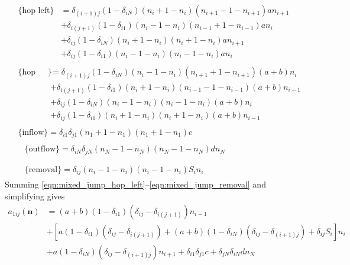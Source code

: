 \documentclass[a4paper,11pt]{article}
\numberwithin{equation}{section}
\newcommand{\V}[1]{\mathbf{#1}}
\begin{document}
\begin{align}
    &\begin{aligned}
        \{\text{hop left}\}
        &= \delta_{(i+1)j}(1 - \delta_{iN})(n_i + 1 - n_i)(n_{i+1} - 1 -
        n_{i+1})a n_{i+1}\\
        &+ \delta_{i(j+1)}(1 - \delta_{i1})(n_i - 1 - n_i)(n_{i-1} + 1 -
        n_{i-1})a n_i\\
        &+ \delta_{ij}(1 - \delta_{iN})(n_i + 1 - n_i)(n_i + 1 - n_i)a n_{i+1}\\
        &+ \delta_{ij}(1 - \delta_{i1})(n_i - 1 - n_i)(n_i - 1 - n_i)a n_i
        \label{eqn:mixed_jump_hop_left}
    \end{aligned}\\
    &\begin{aligned}
        \{\text{hop right}\}
        &= \delta_{(i+1)j}(1 - \delta_{iN})(n_i - 1 - n_i)(n_{i+1} + 1 -
        n_{i+1})(a+b) n_i\\
        &+ \delta_{i(j+1)}(1 - \delta_{i1})(n_i + 1 - n_i)(n_{i-1} - 1 -
        n_{i-1})(a+b) n_{i-1}\\
        &+ \delta_{ij}(1 - \delta_{iN})(n_i - 1 - n_i)(n_i - 1 - n_i)(a+b) n_i\\
        &+ \delta_{ij}(1 - \delta_{i1})(n_i + 1 - n_i)(n_i + 1 - n_i)(a+b)
        n_{i-1}
        \label{eqn:mixed_jump_hop_right}
    \end{aligned}\\
    &\begin{aligned}
        \{\text{inflow}\} = \delta_{i1}\delta_{j1} (n_1 + 1 - n_1)(n_1 + 1 -
        n_1)c
        \label{eqn:mixed_jump_inflow}
    \end{aligned}\\
    &\begin{aligned}
        &\{\text{outflow}\} = \delta_{iN}\delta_{jN} (n_N - 1 - n_N)(n_N - 1 - n_N)d
        n_N\\
        \label{eqn:mixed_jump_outflow}
    \end{aligned}\\
    &\begin{aligned}
        &\{\text{removal}\} = \delta_{ij}(n_i - 1 - n_i)(n_i - 1 - n_i)S_i n_i
        \label{eqn:mixed_jump_removal}
    \end{aligned}
\end{align}
Summing \eqref{eqn:mixed_jump_hop_left}--\eqref{eqn:mixed_jump_removal} and
simplifying gives
\begin{equation}
    \begin{aligned}
        a_{1ij}(\V{n}) &= (a+b)(1-\delta_{i1})(\delta_{ij} -
        \delta_{i(j+1)})n_{i-1}\\
        &+ \left[ a(1-\delta_{i1})(\delta_{ij} -
        \delta_{i(j+1)}) + (a+b)(1-\delta_{iN})(\delta_{ij}-\delta_{(i+1)j}) +
    \delta_{ij}S_i \right]n_i\\
    &+ a(1-\delta_{iN})(\delta_{ij} - \delta_{(i+1)j})n_{i+1} +
    \delta_{i1}\delta_{j1}c + \delta_{jN}\delta_{iN}d n_N
    \end{aligned}
\end{equation}
\end{document}
